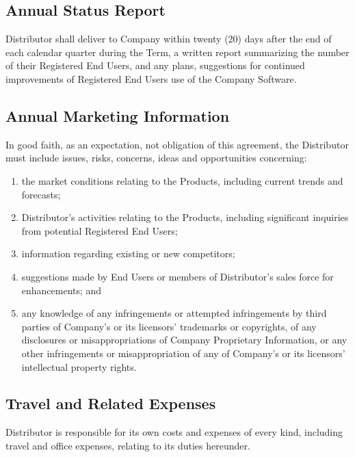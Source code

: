 \documentclass[letterpaper,10pt,openany,oneside,english]{sphinxmanual}
\begin{document}
\subsection{Annual Status Report}
\label{\detokenize{additionalresponsibilities2:annual-status-report}}
Distributor shall deliver to Company within twenty (20) days after the end of each calendar quarter during the Term, a written report summarizing the number of their Registered End Users, and any plans, suggestions for continued improvements of Registered End Users use of the Company Software.


\subsection{Annual Marketing Information}
\label{\detokenize{additionalresponsibilities2:annual-marketing-information}}
In good faith, as an expectation, not obligation of this agreement, the Distributor must include issues, risks, concerns, ideas and opportunities concerning:
\begin{enumerate}
\item {} 
the market conditions relating to the Products, including current trends and forecasts;

\item {} 
Distributor’s activities relating to the Products, including significant inquiries from potential Registered End Users;

\item {} 
information regarding existing or new competitors;

\item {} 
suggestions made by End Users or members of Distributor’s sales force for enhancements; and

\item {} 
any knowledge of any infringements or attempted infringements by third parties of Company’s or its licensors’ trademarks or copyrights, of any disclosures or misappropriations of Company Proprietary Information, or any other infringements or misappropriation of any of Company’s or its licensors’ intellectual property rights.

\end{enumerate}


\subsection{Travel and Related Expenses}
\label{\detokenize{additionalresponsibilities2:travel-and-related-expenses}}
Distributor is responsible for its own costs and expenses of every kind, including travel and office expenses, relating to its duties hereunder.
\end{document}
